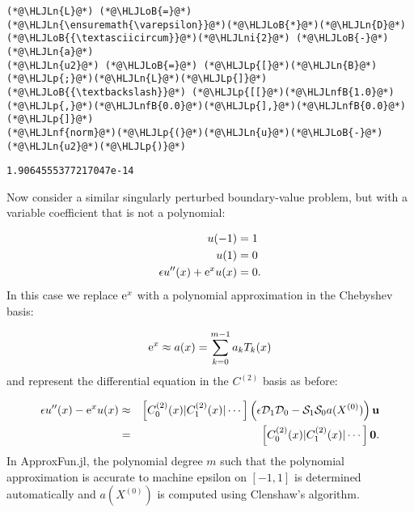 \documentclass[12pt,a4paper]{article}
\newcommand{\HLJLn}[1]{#1}
\newcommand{\HLJLnf}[1]{\textcolor[RGB]{66,102,213}{#1}}
\newcommand{\HLJLnfB}[1]{\textcolor[RGB]{59,151,46}{#1}}
\newcommand{\HLJLni}[1]{\textcolor[RGB]{59,151,46}{#1}}
\newcommand{\HLJLoB}[1]{\textcolor[RGB]{102,102,102}{\textbf{#1}}}
\newcommand{\HLJLp}[1]{#1}
\begin{document}
\begin{lstlisting}
(*@\HLJLn{L}@*) (*@\HLJLoB{=}@*) (*@\HLJLn{\ensuremath{\varepsilon}}@*)(*@\HLJLoB{*}@*)(*@\HLJLn{D}@*)(*@\HLJLoB{{\textasciicircum}}@*)(*@\HLJLni{2}@*) (*@\HLJLoB{-}@*) (*@\HLJLn{a}@*)
(*@\HLJLn{u2}@*) (*@\HLJLoB{=}@*) (*@\HLJLp{[}@*)(*@\HLJLn{B}@*)(*@\HLJLp{;}@*)(*@\HLJLn{L}@*)(*@\HLJLp{]}@*) (*@\HLJLoB{{\textbackslash}}@*) (*@\HLJLp{[[}@*)(*@\HLJLnfB{1.0}@*)(*@\HLJLp{,}@*)(*@\HLJLnfB{0.0}@*)(*@\HLJLp{],}@*)(*@\HLJLnfB{0.0}@*)(*@\HLJLp{]}@*)
(*@\HLJLnf{norm}@*)(*@\HLJLp{(}@*)(*@\HLJLn{u}@*)(*@\HLJLoB{-}@*)(*@\HLJLn{u2}@*)(*@\HLJLp{)}@*)
\end{lstlisting}

\begin{lstlisting}
1.9064555377217047e-14
\end{lstlisting}


Now consider a similar singularly perturbed boundary-value problem, but with a variable coefficient that is not a polynomial:


\begin{align*}
u(-1) &= 1\\
u(1) &= 0\\
\epsilon u''(x) + {\rm e}^xu(x) &= 0.
\end{align*}
In this case we replace  ${\rm e}^{x}$ with a polynomial approximation in the Chebyshev basis:

\[
{\rm e}^{x} \approx a(x) = \sum_{k = 0}^{m-1} a_kT_k(x)
\]
and represent the differential equation in the $C^{(2)}$ basis  as before:


\begin{eqnarray*}
\epsilon u''(x) - {\rm e}^{x}u(x)  &\approx & \left[ C_0^{(2)}(x) | C_1^{(2)}(x) | \cdots \right]\left(\epsilon\mathcal{D}_1\mathcal{D}_0  - \mathcal{S}_1\mathcal{S}_0a(X^{(0)})  \right) \mathbf{u} \\
 &=& \left[ C_0^{(2)}(x) | C_1^{(2)}(x) | \cdots \right]\mathbf{0}.
 \end{eqnarray*}
In ApproxFun.jl, the polynomial degree $m$ such that the polynomial approximation is accurate to machine epsilon on $[-1, 1]$ is determined automatically and $a(X^{(0)})$ is computed using Clenshaw's algorithm.
\end{document}
